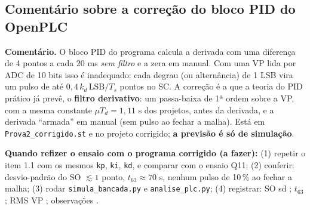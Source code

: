 \documentclass[11pt,a4paper]{article}
\begin{document}
\subsection{Comentário sobre a correção do bloco PID do OpenPLC}\label{comcorr}
\textbf{Comentário.} O bloco PID do programa calcula a derivada com uma diferença de 4 pontos a cada 20 ms \emph{sem filtro} e a zera em manual. Com uma VP lida por ADC de 10 bits isso é inadequado: cada degrau (ou alternância) de 1 LSB vira um pulso de até $0{,}4\,k_d\,\mathrm{LSB}/T_s$ pontos no SC. A correção é a que a teoria do PID prático já prevê, o \textbf{filtro derivativo}: um passa-baixa de 1ª ordem sobre a VP, com a mesma constante $\mu T_d=1{,}11$ s dos projetos, antes da derivada, e a derivada ``armada'' em manual (sem pulso ao fechar a malha). Está em \texttt{Prova2\_corrigido.st} e no projeto corrigido; \textbf{a previsão é só de simulação}.
\begin{real}\textbf{Quando refizer o ensaio com o programa corrigido (a fazer):} (1) repetir o item 1.1 com os mesmos \texttt{kp}, \texttt{ki}, \texttt{kd}, e comparar com o ensaio Q11; (2) conferir: desvio-padrão do SO $\lesssim1$ ponto, $t_{63}\approx70$ s, nenhum pulso de 10\,\% ao fechar a malha; (3) rodar \texttt{simula\_bancada.py} e \texttt{analise\_plc.py}; (4) registrar: SO sd \underline{\hspace{1.3cm}}; $t_{63}$ \underline{\hspace{1.3cm}}; RMS VP \underline{\hspace{1.3cm}}; observações \underline{\hspace{4cm}}.\end{real}
\end{document}
